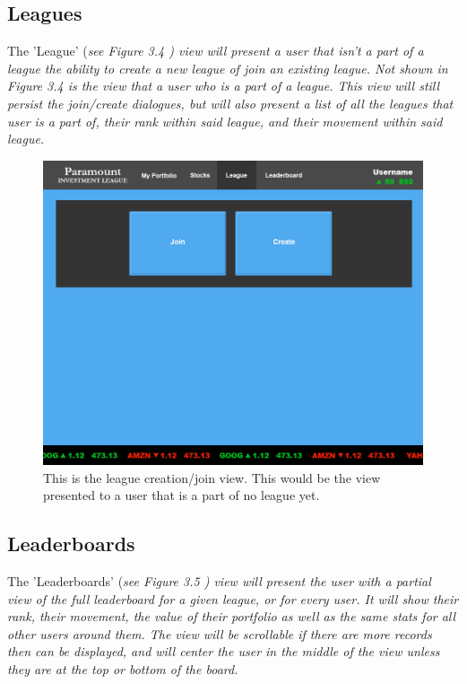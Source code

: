 \subsection{Leagues}

The 'League' (\em see Figure 3.4 \em) view will present a user that isn't a part of a league
the ability to create a new league of join an existing league.  Not shown in
\em Figure 3.4 \em is the view that a user who is a part of a league.  This view will still
persist the join/create dialogues, but will also present a list of all the leagues that user
is a part of, their rank within said league, and their movement within said league.\\

\begin{figure}
\centering
\includegraphics[width=5.5in]{./img/mock/league.jpg}
\caption{This is the league creation/join view. This would be the view presented to a user
that is a part of no league yet.}
\end{figure}


\subsection{Leaderboards}

The 'Leaderboards' (\em see Figure 3.5 \em) view will present the user with a partial view
of the full leaderboard for a given league, or for every user.  It will show their rank,
their movement, the value of their portfolio as well as the same stats for all other users
around them.  The view will be scrollable if there are more records then can be displayed,
and will center the user in the middle of the view unless they are at the top or bottom
of the board.\\

